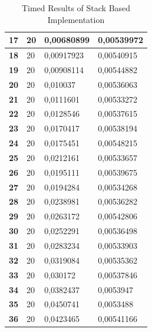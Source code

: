 \documentclass[a4paper]{article}
\begin{document}
\begin{table}[H]
\begin{tabular}{|l|l|l|l|}
\textbf{17}     & 20                 & 0,00680899                   & 0,00539972                     \\ \hline
\textbf{18}     & 20                 & 0,00917923                   & 0,00540915                     \\ \hline
\textbf{19}     & 20                 & 0,00908114                   & 0,00544882                     \\ \hline
\textbf{20}     & 20                 & 0,010037                     & 0,00536063                     \\ \hline
\textbf{21}     & 20                 & 0,0111601                    & 0,00533272                     \\ \hline
\textbf{22}     & 20                 & 0,0128546                    & 0,00537615                     \\ \hline
\textbf{23}     & 20                 & 0,0170417                    & 0,00538194                     \\ \hline
\textbf{24}     & 20                 & 0,0175451                    & 0,00548215                     \\ \hline
\textbf{25}     & 20                 & 0,0212161                    & 0,00533657                     \\ \hline
\textbf{26}     & 20                 & 0,0195111                    & 0,00539675                     \\ \hline
\textbf{27}     & 20                 & 0,0194284                    & 0,00534268                     \\ \hline
\textbf{28}     & 20                 & 0,0238981                    & 0,00536282                     \\ \hline
\textbf{29}     & 20                 & 0,0263172                    & 0,00542806                     \\ \hline
\textbf{30}     & 20                 & 0,0252291                    & 0,00536498                     \\ \hline
\textbf{31}     & 20                 & 0,0283234                    & 0,00533903                     \\ \hline
\textbf{32}     & 20                 & 0,0319084                    & 0,00535362                     \\ \hline
\textbf{33}     & 20                 & 0,030172                     & 0,00537846                     \\ \hline
\textbf{34}     & 20                 & 0,0382437                    & 0,0053947                      \\ \hline
\textbf{35}     & 20                 & 0,0450741                    & 0,0053488                      \\ \hline
\textbf{36}     & 20                 & 0,0423465                    & 0,00541166                     \\ \hline
\end{tabular}
\caption{Timed Results of Stack Based Implementation}
\end{table}
\end{document}
